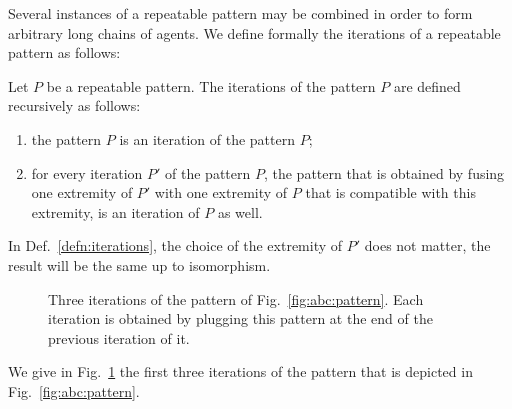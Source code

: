 \documentclass{entcs}
\begin{document}
Several instances of a repeatable pattern may be combined in order to form arbitrary long chains of agents. We define formally the iterations of a repeatable pattern as follows:

\begin{defn}
  \label{defn:iterations}
  Let $P$ be a repeatable pattern.
The iterations of the pattern $P$ are defined recursively as follows:
\begin{enumerate}
  \item the pattern $P$ is an iteration of the pattern $P$;
  \item for every iteration $P'$ of the pattern $P$, the pattern that is obtained by fusing one extremity of $P'$ with one extremity of $P$ that is compatible with this extremity, is an iteration of $P$ as well.
\end{enumerate}
\end{defn}

In Def.~\ref{defn:iterations}, the choice of the extremity of $P'$ does not matter, the result will be the same up to isomorphism.

\begin{figure}[t]





  \caption{Three iterations of the pattern of Fig.~\ref{fig:abc:pattern}.
  Each iteration is obtained by plugging this pattern at the end of the previous iteration of it.}
  \label{fig:iterations}
\end{figure}
\begin{exmp}
We give in Fig.~\ref{fig:iterations} the first three iterations of the pattern that is depicted in Fig.~\ref{fig:abc:pattern}.
\end{exmp}
\end{document}
